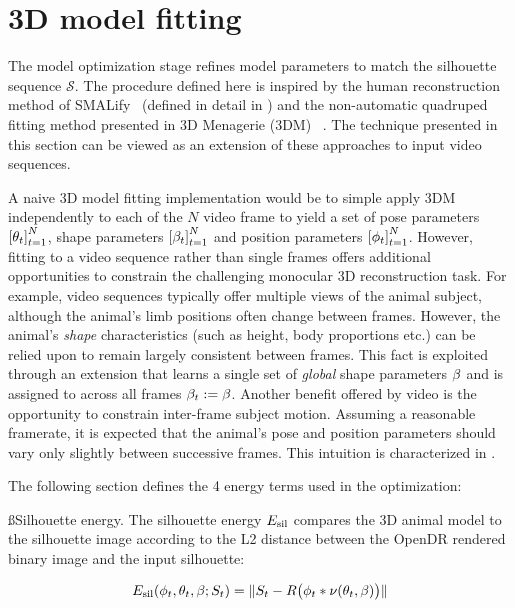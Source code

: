 
\section{3D model fitting}
The model optimization stage refines model parameters to match the silhouette sequence $\mathcal S$. The procedure defined here is inspired by the human reconstruction method of SMALify~\cite{bogo16keep} (defined in detail in ) and the non-automatic quadruped fitting method presented in 3D Menagerie (3DM) ~\cite{zuffi2017menagerie}. The technique presented in this section can be viewed as an extension of these approaches to input video sequences. 

A naive 3D model fitting implementation would be to simple apply 3DM independently to each of the $N$ video frame to yield a set of pose parameters $\left[{\theta_{t}}\right]_{t=1}^{N}$, shape parameters $\left[{\beta_{t}}\right]_{t=1}^{N}$ and position parameters $\left[{\phi_{t}}\right]_{t=1}^{N}$. However, fitting to a video sequence rather than single frames offers additional opportunities to constrain the challenging monocular 3D reconstruction task. For example, video sequences typically offer multiple views of the animal subject, although the animal's limb positions often change between frames. However, the animal's \emph{shape} characteristics (such as height, body proportions etc.) can be relied upon to remain largely consistent between frames. This fact is exploited through an extension that learns a single set of \emph{global} shape parameters $\beta$ and is assigned to across all frames $\beta_{t} := \beta$. Another benefit offered by video is the opportunity to constrain inter-frame subject motion. Assuming a reasonable framerate, it is expected that the animal's pose and position parameters should vary only slightly between successive frames. This intuition is characterized in .

The following section defines the 4 energy terms used in the optimization: 

\ss{Silhouette energy.}
The silhouette energy $E_\textrm{sil}$ compares the 3D animal model to the silhouette image according to the L2 distance between the OpenDR rendered binary image and the input silhouette:

\begin{equation}
E_\textrm{sil}(\phi_{t}, \theta_{t}, \beta; S_{t}) = \lVert S_{t} - R\bigl(\phi_{t} * \nu(\theta_{t}, \beta)\bigr) \rVert
\end{equation}

